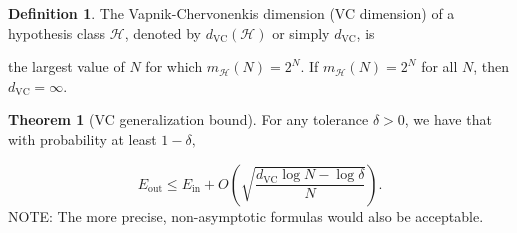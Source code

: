 \documentclass[10pt]{exam}
\theoremstyle{definition}
\newtheorem{defn}{Definition}
\newtheorem{theorem}{Theorem}
\newcommand{\E}{\mathbb E}
\DeclareMathOperator{\prob}{\mathbb P}
\newcommand{\Ein}{E_{\text{in}}}
\newcommand{\Eout}{E_{\text{out}}}
\newcommand{\mH}{m_{\mathcal H}}
\newcommand{\dvc}{{d_{\text{VC}}}}
\newcommand{\ignore}[1]{}
\begin{document}
\ignore{
\begin{theorem}[Hoeffding Inequality]
    Let $a_1, ..., a_N$ be $N$ independent and identically distributed random variables satisfying $0 \le a_i \le 1$.
    Let $\nu = \tfrac1n\sum_{i=1}^N a_i$ be the empirical average and $\mu = \E \nu$ be the true mean of the underlying distribution.
    Then, for all $\epsilon > 0$,
    \begin{solutionorbox}
    \begin{equation*}
        \label{eq:hoef}
        \prob\big(|\nu - \mu| \ge \epsilon\big)
        \le 
        2 \exp (-2\epsilon^2 N)
        .
    \end{equation*}
    \end{solutionorbox}
\end{theorem}

\begin{theorem}[Finite Hypothesis Class Generalization]
    Let $\mathcal H$ be a hypothesis class of size $M$,
    let $g$ be an arbitrary hypothesis in $\mathcal H$
    (in particular, $g$ is allowed to be the result of the TEA algorithm),
    and let $N$ be the size of the dataset.
    Then we have that for all $\epsilon>0$,
    \begin{equation*}
    \prob[|\Ein(g) - \Eout(g)| \ge \epsilon] \le 2M\exp(-2\epsilon^2 N).
    \end{equation*}
    This implies that with probability at least $1-\delta$,
    \begin{equation*}
        \Eout(g) \le \Ein(g) + \sqrt{\frac{1}{2N} \log\frac{2M}{\delta}}.
    \end{equation*}
\end{theorem}
}

\begin{defn}
    The Vapnik-Chervonenkis dimension (VC dimension) of a hypothesis class $\mathcal H$, denoted by $\dvc(\mathcal H)$ or simply $\dvc$, is 
    \begin{solution}
        the largest value of $N$ for which $\mH(N) = 2^N$.
        If $\mH(N) = 2^N$ for all $N$, then $\dvc = \infty$.
    \end{solution}
\end{defn}

\begin{theorem}[VC generalization bound]
    For any tolerance $\delta>0$, we have that with probability at least $1-\delta,$
    \begin{solutionorbox}
    \begin{equation*}
        \Eout 
         \le
         \Ein
         +
         O\left(\sqrt{\frac{\dvc\log N - \log\delta}{N}}\right).
    \end{equation*}
        NOTE: The more precise, non-asymptotic formulas would also be acceptable.
    \end{solutionorbox}

\end{theorem}
\end{document}

